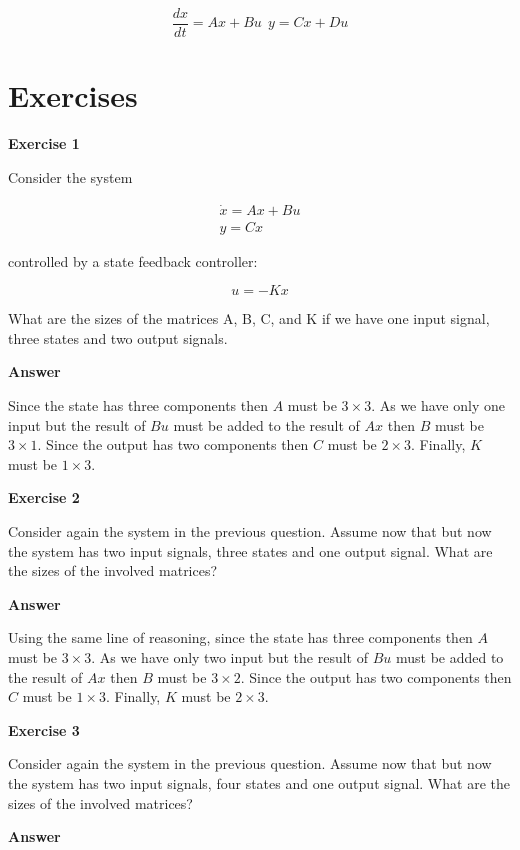 \begin{equation}
\frac{dx}{dt} = Ax + Bu ~~ y = Cx + Du
\end{equation}


\section{Exercises}

\textbf{Exercise 1}

Consider the system 

\begin{eqnarray}
\dot{x} = Ax + Bu \\
y = Cx 
\end{eqnarray}

controlled by a state feedback controller: 

\begin{equation}
 u = -Kx  
\end{equation}

What are  the sizes of the matrices A, B, C, and K if we have one input signal, three states and two output signals.

\textbf{Answer}

Since the state has three components then $A$ must be $3\times 3$. As we have only one input but the result of $Bu$ must be added to the result of $Ax$ then $B$ must be $3\times 1$.
Since the output has two components then $C$ must be $2\times 3$. Finally, $K$ must be $1\times 3$.

\textbf{Exercise 2}

Consider again the system in the previous  question. Assume now that but now the system has two input signals, three states and one output signal. What are the sizes of the involved matrices?

\textbf{Answer}

Using the same line of reasoning, since the state has three components then $A$ must be $3\times 3$. As we have only two input but the result of $Bu$ must be added to the result of $Ax$ then $B$ must be $3\times 2$. Since the output has two components then $C$ must be $1\times 3$. Finally, $K$ must be $2\times 3$.


\textbf{Exercise 3}

Consider again the system in the previous  question. Assume now that but now the system has two input signals, four states and one output signal. What are the sizes of the involved matrices?

\textbf{Answer}

